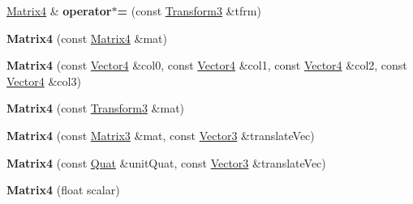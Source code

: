 \begin{DoxyCompactItemize}
\item 
\hypertarget{class_vectormath_1_1_aos_1_1_matrix4_a70fa2ef1c57440428ffc006b235c4776}{\hyperlink{class_vectormath_1_1_aos_1_1_matrix4}{Matrix4} \& {\bfseries operator$\ast$=} (const \hyperlink{class_vectormath_1_1_aos_1_1_transform3}{Transform3} \&tfrm)}\label{class_vectormath_1_1_aos_1_1_matrix4_a70fa2ef1c57440428ffc006b235c4776}

\item 
\hypertarget{class_vectormath_1_1_aos_1_1_matrix4_a025fe2cfa1581016444f2306c1112344}{{\bfseries Matrix4} (const \hyperlink{class_vectormath_1_1_aos_1_1_matrix4}{Matrix4} \&mat)}\label{class_vectormath_1_1_aos_1_1_matrix4_a025fe2cfa1581016444f2306c1112344}

\item 
\hypertarget{class_vectormath_1_1_aos_1_1_matrix4_aacf4de7f6db283ad9004ca4328786ce9}{{\bfseries Matrix4} (const \hyperlink{class_vectormath_1_1_aos_1_1_vector4}{Vector4} \&col0, const \hyperlink{class_vectormath_1_1_aos_1_1_vector4}{Vector4} \&col1, const \hyperlink{class_vectormath_1_1_aos_1_1_vector4}{Vector4} \&col2, const \hyperlink{class_vectormath_1_1_aos_1_1_vector4}{Vector4} \&col3)}\label{class_vectormath_1_1_aos_1_1_matrix4_aacf4de7f6db283ad9004ca4328786ce9}

\item 
\hypertarget{class_vectormath_1_1_aos_1_1_matrix4_a3fa883e2169015e3de19961e2c1256a1}{{\bfseries Matrix4} (const \hyperlink{class_vectormath_1_1_aos_1_1_transform3}{Transform3} \&mat)}\label{class_vectormath_1_1_aos_1_1_matrix4_a3fa883e2169015e3de19961e2c1256a1}

\item 
\hypertarget{class_vectormath_1_1_aos_1_1_matrix4_ad5545bd33ad2e9d1447c815b3e905bca}{{\bfseries Matrix4} (const \hyperlink{class_vectormath_1_1_aos_1_1_matrix3}{Matrix3} \&mat, const \hyperlink{class_vectormath_1_1_aos_1_1_vector3}{Vector3} \&translate\+Vec)}\label{class_vectormath_1_1_aos_1_1_matrix4_ad5545bd33ad2e9d1447c815b3e905bca}

\item 
\hypertarget{class_vectormath_1_1_aos_1_1_matrix4_abec1bfbf4970db96b114ef8410243138}{{\bfseries Matrix4} (const \hyperlink{class_vectormath_1_1_aos_1_1_quat}{Quat} \&unit\+Quat, const \hyperlink{class_vectormath_1_1_aos_1_1_vector3}{Vector3} \&translate\+Vec)}\label{class_vectormath_1_1_aos_1_1_matrix4_abec1bfbf4970db96b114ef8410243138}

\item 
\hypertarget{class_vectormath_1_1_aos_1_1_matrix4_ad68959c1e281a215bc923cd8f9c0ce9f}{{\bfseries Matrix4} (float scalar)}\label{class_vectormath_1_1_aos_1_1_matrix4_ad68959c1e281a215bc923cd8f9c0ce9f}


\end{DoxyCompactItemize}
